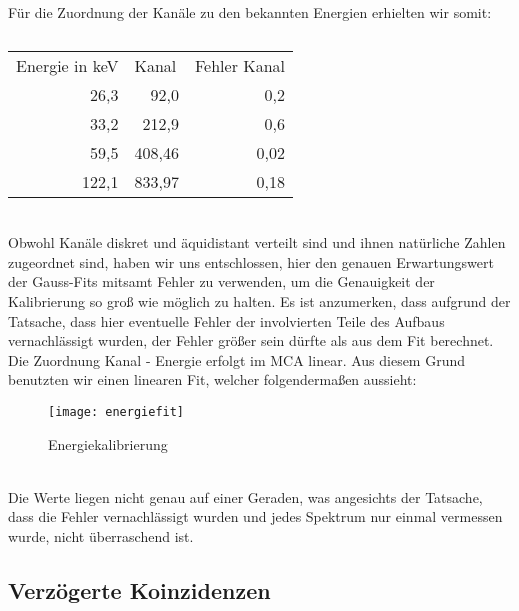 Für die Zuordnung der Kanäle zu den bekannten Energien erhielten wir somit: \\
\begin{table}[htbp]
\caption{}
\begin{tabular}{rrr}

\multicolumn{1}{l}{Energie in keV} & \multicolumn{1}{l}{Kanal} & \multicolumn{1}{l}{Fehler Kanal} \\ 
26,3 & 92,0 & 0,2 \\ 
33,2 & 212,9 & 0,6 \\ 
59,5 & 408,46 & 0,02 \\ 
122,1 & 833,97 & 0,18 \\ 
\end{tabular}
\end{table} \\
Obwohl Kanäle diskret und äquidistant verteilt sind und ihnen natürliche Zahlen zugeordnet sind, haben wir uns entschlossen, hier den genauen Erwartungswert der Gauss-Fits mitsamt Fehler zu verwenden, um die Genauigkeit der Kalibrierung so groß wie möglich zu halten. Es ist anzumerken, dass aufgrund der Tatsache, dass hier eventuelle Fehler der involvierten Teile des Aufbaus vernachlässigt wurden, der Fehler größer sein dürfte als aus dem Fit berechnet. \\
Die Zuordnung Kanal - Energie erfolgt im MCA linear. Aus diesem Grund benutzten wir einen linearen Fit, welcher folgendermaßen aussieht: \\
\begin{figure}[h]
\texttt{[image: energiefit]}
\caption{Energiekalibrierung}
\end{figure}\\
Die Werte liegen nicht genau auf einer Geraden, was angesichts der Tatsache, dass die Fehler vernachlässigt wurden und jedes Spektrum nur einmal vermessen wurde, nicht überraschend ist. 
\subsection{Verzögerte Koinzidenzen}
